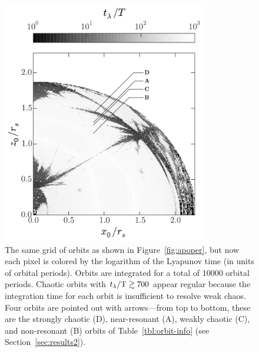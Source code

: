 \documentclass{mn2e}
\newcommand{\periods}{\ensuremath{{\rm T}}}
\begin{document}
\begin{figure}[!h]%
\begin{center}
\includegraphics[width=0.8\textwidth, trim={0 0 0 0}]{figures/lyap_map.pdf}
\caption{ The same grid of orbits as shown in Figure~\ref{fig:apoper}, but now each pixel is colored by the logarithm of the Lyapunov time (in units of orbital periods). Orbits are integrated for a total of 10000 orbital periods. Chaotic orbits with $t_\lambda/\periods \gtrsim 700$ appear regular because the integration time for each orbit is insufficient to resolve weak chaos. Four orbits are pointed out with arrows---from top to bottom, these are the strongly chaotic (D), near-resonant (A), weakly chaotic (C), and non-resonant (B) orbits of Table~\ref{tbl:orbit-info} (see Section~\ref{sec:results2}).} \label{fig:lyapmap}
\end{center}
\end{figure}
\end{document}

